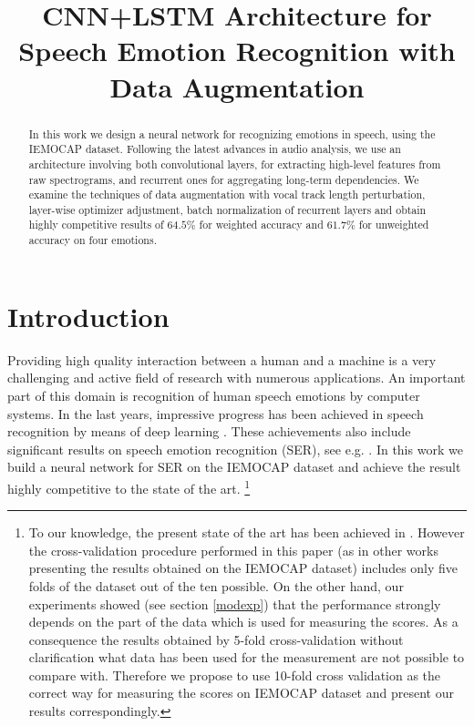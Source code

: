 \documentclass[a4paper]{article}
\title{CNN+LSTM Architecture for Speech Emotion Recognition with Data Augmentation}
\date{}
\begin{document}
\maketitle
\begin{abstract}
In this work we design a neural network for recognizing emotions in speech, using the IEMOCAP dataset. 
Following the latest advances in audio analysis, we use an architecture involving both convolutional layers, for extracting high-level features 
from raw spectrograms, and recurrent ones for aggregating long-term dependencies. We examine the techniques of data augmentation with vocal track length perturbation, 
layer-wise optimizer adjustment, batch normalization of recurrent layers and obtain highly competitive results of $64.5\%$ for weighted accuracy and $61.7\%$ for
unweighted accuracy on four emotions.
\end{abstract}


\section{Introduction}
Providing high quality interaction between a human and a machine is a very challenging and active field of research with numerous applications. 
An important part of this domain is recognition of human speech emotions by computer systems. In the last years, impressive progress has been achieved in 
speech recognition by means of deep learning \cite{Baidu,Medennikov+2016,Saon+2016,gatedCNN}. These achievements also include significant results on speech 
emotion recognition (SER), see e.g. \cite{KimLP13,microsoft,tspredictor}. 
In this work we build a neural network for SER on the IEMOCAP dataset \cite{Busso2008} and achieve the result highly competitive to the state of the art. 
\footnote{To our knowledge, the present state of the art has been achieved in \cite{microsoft}. However the cross-validation procedure performed in this 
paper (as in other works presenting the results obtained on the IEMOCAP dataset) includes only five folds of the dataset out of the ten 
possible. On the other hand, our experiments showed (see section \ref{modexp}) that the performance strongly depends on the part of the data which is used 
for measuring the scores. As a consequence the results obtained by 5-fold cross-validation without clarification what data has been used for the measurement 
are not possible to compare with. 
Therefore we propose to use 10-fold cross validation as the correct way for measuring the scores on IEMOCAP dataset and present our results correspondingly.} 
\end{document}
